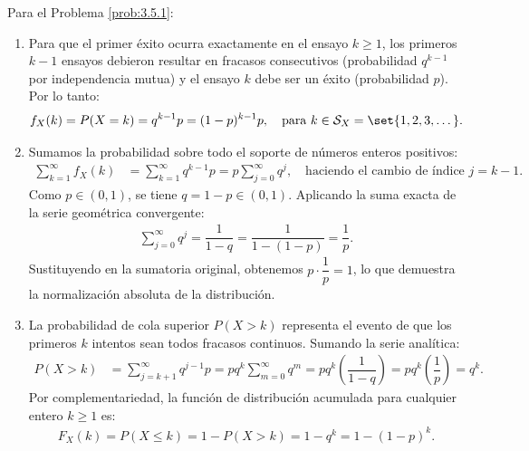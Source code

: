 \begin{solucion}
	\label{sol:3.5.1}
	Para el Problema \ref{prob:3.5.1}:
	\begin{enumerate}
		\item Para que el primer éxito ocurra exactamente en el ensayo $k \ge 1$, los primeros $k-1$ ensayos debieron resultar en fracasos consecutivos (probabilidad $q^{k-1}$ por independencia mutua) y el ensayo $k$ debe ser un éxito (probabilidad $p$). Por lo tanto:
		\begin{align*}
			f_X(k) = P(X = k) = q^{k-1}p = (1-p)^{k-1}p, \quad \text{para } k \in \mathcal{S}_X = \set{1, 2, 3, \dots}.
		\end{align*}
		\item Sumamos la probabilidad sobre todo el soporte de números enteros positivos:
		\begin{align*}
			\sum_{k=1}^{\infty} f_X(k) &= \sum_{k=1}^{\infty} q^{k-1}p = p \sum_{j=0}^{\infty} q^j, \quad \text{haciendo el cambio de índice } j = k-1.
		\end{align*}
		Como $p \in (0, 1)$, se tiene $q = 1-p \in (0, 1)$. Aplicando la suma exacta de la serie geométrica convergente:
		\begin{align*}
			\sum_{j=0}^{\infty} q^j = \dfrac{1}{1 - q} = \dfrac{1}{1 - (1-p)} = \dfrac{1}{p}.
		\end{align*}
		Sustituyendo en la sumatoria original, obtenemos $p \cdot \dfrac{1}{p} = 1$, lo que demuestra la normalización absoluta de la distribución.
		\item La probabilidad de cola superior $P(X > k)$ representa el evento de que los primeros $k$ intentos sean todos fracasos continuos. Sumando la serie analítica:
		\begin{align*}
			P(X > k) &= \sum_{j=k+1}^{\infty} q^{j-1}p = p q^k \sum_{m=0}^{\infty} q^m = p q^k \left(\dfrac{1}{1-q}\right) = p q^k \left(\dfrac{1}{p}\right) = q^k.
		\end{align*}
		Por complementariedad, la función de distribución acumulada para cualquier entero $k \ge 1$ es:
		\begin{align*}
			F_X(k) = P(X \le k) = 1 - P(X > k) = 1 - q^k = 1 - (1-p)^k.
		\end{align*}
	\end{enumerate}
\end{solucion}

